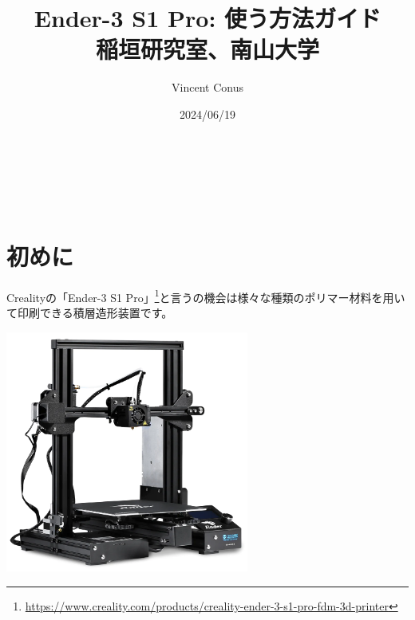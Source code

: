 \documentclass[10pt,a4paper,onecolumn,notitlepage,oneside,dvipdfmx]{article}
\author{Vincent Conus}
\date{2024/06/19}
\title{Ender-3 S1 Pro: 使う方法ガイド\\\medskip
\large 稲垣研究室、南山大学}
\makeatletter
\renewcommand{\maketitle}{%
\begin{center}{\Large \@title}\end{center}%
\begin{flushright}\@author\\ \@date\end{flushright}%
\hrulefill\\}
\makeatother
\begin{document}
\maketitle
\tableofcontents

\section{初めに}
\label{sec:org234575f}
Crealityの「Ender-3 S1 Pro」\footnote{\url{https://www.creality.com/products/creality-ender-3-s1-pro-fdm-3d-printer}}と言うの機会は様々な種類のポリマー材料を用いて印刷できる積層造形装置です。

\begin{center}
\includegraphics[width=0.6\textwidth]{img/ender3.png}
\end{center}
\end{document}
